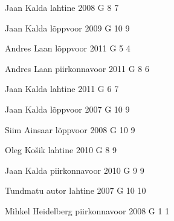 \documentclass[11pt]{article}
\begin{document}
{Jaan Kalda} %
{lahtine} %
{2008} %
{G 8} %
{7} %
{

\ifEngHint
\fi
}

{Jaan Kalda} %
{lõppvoor} %
{2009} %
{G 10} %
{9} %
{

\ifEngHint
\fi
}

{Andres Laan} %
{lõppvoor} %
{2011} %
{G 5} %
{4} %
{

\ifEngHint
\fi
}

{Andres Laan} %
{piirkonnavoor} %
{2011} %
{G 8} %
{6} %
{

\ifEngHint
\fi
}

{Jaan Kalda} %
{lahtine} %
{2011} %
{G 6} %
{7} %
{

\ifEngHint
\fi
}

{Jaan Kalda} %
{lõppvoor} %
{2007} %
{G 10} %
{9} %
{

\ifEngHint
\fi
}

{Siim Ainsaar} %
{lõppvoor} %
{2008} %
{G 10} %
{9} %
{

\ifEngHint
\fi
}

{Oleg Košik} %
{lahtine} %
{2010} %
{G 8} %
{9} %
{

\ifEngHint
\fi
}

{Jaan Kalda} %
{piirkonnavoor} %
{2010} %
{G 9} %
{9} %
{

\ifEngHint
\fi
}

{Tundmatu autor} %
{lahtine} %
{2007} %
{G 10} %
{10} %
{

\ifEngHint
\fi
}

{Mihkel Heidelberg} %
{piirkonnavoor} %
{2008} %
{G 1} %
{1} %
{

\ifEngHint
\fi
}
\end{document}
